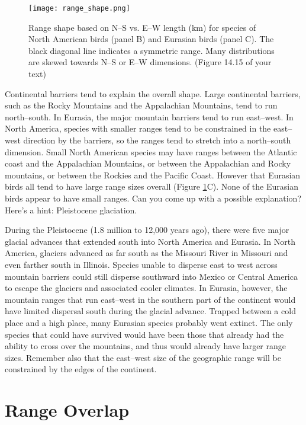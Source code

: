 \documentclass[11pt, hidelinks]{article}
\begin{document}
\begin{figure}
	\centering
		\texttt{[image: range\_shape.png]}  
		\caption{Range shape based on N--S vs. E--W length (km) for species of North American birds (panel B) and Eurasian birds (panel C). The black diagonal line indicates a symmetric range. Many distributions are skewed towards N--S or E--W dimensions. (Figure 14.15 of your text) \label{range shape}}
\end{figure}

Continental barriers tend to explain the overall shape.  Large continental barriers, such as the Rocky Mountains and the Appalachian Mountains, tend to run north--south.  In Eurasia, the major mountain barriers tend to run east--west. In North America, species with smaller ranges tend to be constrained in the east--west direction by the barriers, so the ranges tend to stretch into a north--south dimension.  Small North American species may have ranges between the Atlantic coast and the Appalachian Mountains, or between the Appalachian and Rocky mountains, or between the Rockies and the Pacific Coast.  However that Eurasian birds all tend to have large range sizes overall (Figure \ref{range shape}C).  None of the Eurasian birds appear to have small ranges. Can you come up with a possible explanation?  Here's a hint: Pleistocene glaciation.

During the Pleistocene (1.8 million to 12,000 years ago), there were five major glacial advances that extended south into North America and Eurasia. In North America, glaciers advanced as far south as the Missouri River in Missouri and even farther south in Illinois.  Species unable to disperse east to west across mountain barriers could still disperse southward into Mexico or Central America to escape the glaciers and associated cooler climates.  In Eurasia, however, the mountain ranges that run east--west in the southern part of the continent would have limited dispersal south during the glacial advance.  Trapped between a cold place and a high place, many Eurasian species probably went extinct.  The only species that could have survived would have been those that already had the ability to cross over the mountains, and thus would already have larger range sizes. Remember also that the east--west size of the geographic range will be constrained by the edges of the continent.

\section{Range Overlap}
\end{document}
